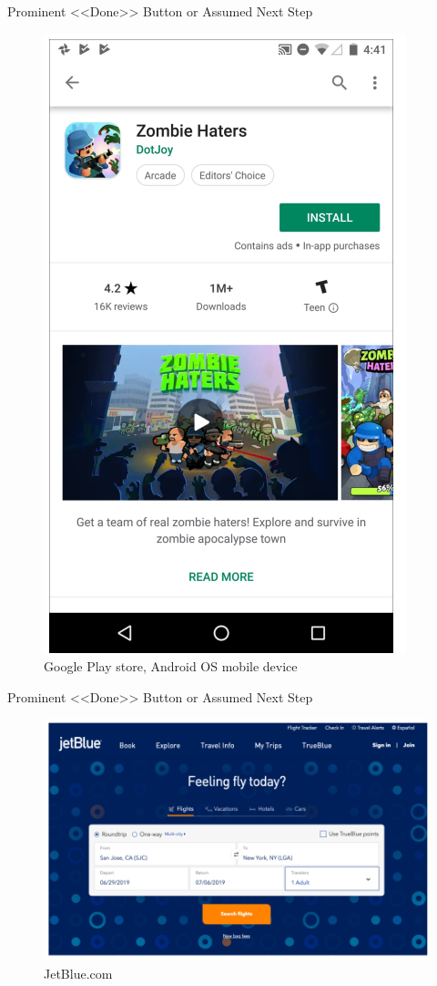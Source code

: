\documentclass{beamer}
\begin{document}
\begin{frame}[t]{Prominent <<Done>> Button or Assumed Next Step}
	\begin{figure}[h]
		\centering
		\includegraphics[scale=0.6]{images/lec08-pic09.png}
		\caption{Google Play store, Android OS mobile device}
	\end{figure}
\end{frame}

\begin{frame}[t]{Prominent <<Done>> Button or Assumed Next Step}
	\begin{figure}[h]
		\centering
		\includegraphics[scale=0.6]{images/lec08-pic10.png}
		\caption{JetBlue.com}
	\end{figure}
\end{frame}
\end{document}
